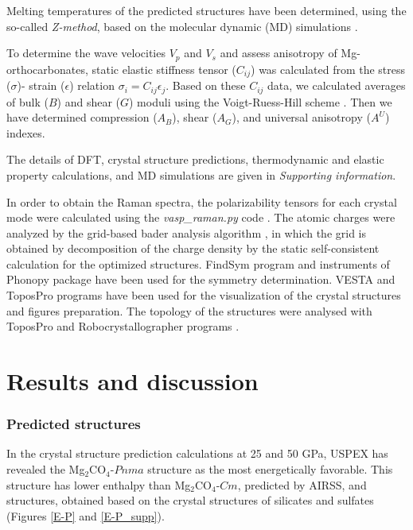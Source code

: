 \documentclass[a4paperm]{article}
\begin{document}
Melting temperatures of the predicted structures have been determined, using the so-called {\it Z-method}, based on the molecular dynamic (MD) simulations \cite{z-method}.

To determine the wave velocities $V_p$ and $V_s$ and assess anisotropy of Mg-orthocarbonates, static elastic stiffness tensor ($C_{ij}$) was calculated from the stress ($\sigma$)- strain ($\epsilon$) relation $\sigma_i=C_{ij}\epsilon_j$.
Based on these $C_{ij}$ data, we calculated averages of bulk ($B$) and shear ($G$) moduli using the Voigt-Ruess-Hill scheme \cite{hill1952,hill1963}.
 Then we have determined compression ($A_B$), shear ($A_G$), and universal anisotropy ($A^U$) indexes.

The details of DFT, crystal structure predictions, thermodynamic and elastic property calculations, and MD simulations are given in {\it Supporting information}.

In order to obtain the Raman spectra, the polarizability tensors for each crystal mode were calculated using the \textit{vasp{\_}raman.py} code \cite{vasp_raman}. 
The atomic charges were analyzed by the grid-based bader analysis algorithm \cite{bader_1,bader_2}, in which the grid is obtained by decomposition of the charge density by the static self-consistent calculation for the optimized structures.
FindSym program \cite{stokes2005} and instruments of Phonopy package have been used for the symmetry determination.
VESTA and ToposPro \cite{vesta,topos} programs have been used for the visualization of the crystal structures and figures preparation.
The topology of the structures were analysed with ToposPro and Robocrystallographer programs \cite{topos,robocrys}.
 

			\section*{Results and discussion}
 
\subsubsection*{Predicted structures}
In the crystal structure prediction calculations at 25 and 50 GPa, USPEX has revealed the Mg$_2$CO$_4$-$Pnma$ structure as the most energetically favorable.
This structure has lower enthalpy than Mg$_2$CO$_4$-$Cm$, predicted by AIRSS, and structures, obtained based on the crystal structures of silicates and sulfates (Figures \ref{E-P} and \ref{E-P_supp}).
\end{document}
